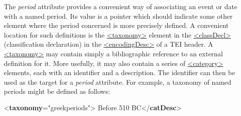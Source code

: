 The {\itshape period} attribute provides a convenient way of associating an event or date with a named period. Its value is a pointer which should indicate some other element where the period concerned is more precisely defined. A convenient location for such definitions is the \hyperref[TEI.taxonomy]{<taxonomy>} element in the \hyperref[TEI.classDecl]{<classDecl>} (classification declaration) in the \hyperref[TEI.encodingDesc]{<encodingDesc>} of a TEI header. A \hyperref[TEI.taxonomy]{<taxonomy>} may contain simply a bibliographic reference to an external definition for it. More usefully, it may also contain a series of \hyperref[TEI.category]{<category>} elements, each with an identifier and a description. The identifier can then be used as the target for a {\itshape period} attribute. For example, a taxonomy of named periods might be defined as follows: \par\bgroup{}\exampleFont \begin{shaded}\noindent\mbox{}{<\textbf{taxonomy}\hspace*{1em}{xml:id}="{greekperiods}">}\mbox{}\newline 
{}\mbox{}\newline 
\hspace*{1em}Before 510 BC{</\textbf{catDesc}>}\mbox{}\newline 
{}\mbox{}\newline 
{}\mbox{}\newline 

\end{shaded}
